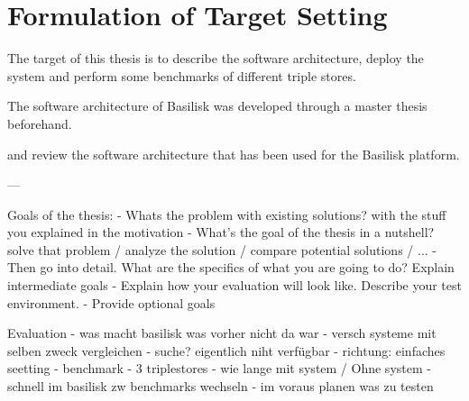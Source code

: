 \chapter{Formulation of Target Setting}
\label{ch:target_setting}

The target of this thesis is to describe the software architecture, deploy the system and perform some benchmarks of different triple stores.



The software architecture of Basilisk was developed through a master thesis beforehand. 

 and review the software architecture that has been used for the Basilisk platform.



---

Goals of the thesis:
- Whats the problem with existing solutions? with the stuff you explained in the motivation
- What's the goal of the thesis in a nutshell? solve that problem / analyze the solution / compare potential solutions / ...
- Then go into detail. What are the specifics of what you are going to do? Explain intermediate goals
- Explain how your evaluation will look like. Describe your test environment. 
- Provide optional goals


Evaluation
- was macht basilisk was vorher nicht da war
- versch systeme mit selben zweck vergleichen
- suche? eigentlich niht verfügbar
- richtung: einfaches seetting
- benchmark
- 3 triplestores
- wie lange mit system / Ohne system
- schnell im basilisk zw benchmarks wechseln
- im voraus planen was zu testen